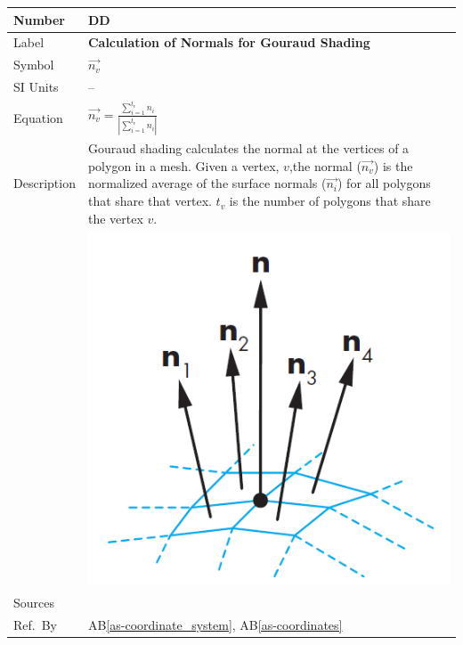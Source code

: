 \documentclass[12pt]{article}
\newcommand{\colAwidth}{0.13\textwidth}
\newcommand{\colBwidth}{0.82\textwidth}
\newcounter{defnum} %
\newcounter{datadefnum} %
\newcommand{\aBref}[1]{AB\ref{#1}}
\begin{document}
\noindent
\begin{minipage}{\textwidth}
	\renewcommand*{\arraystretch}{1.5}
	\begin{tabular}{| p{\colAwidth} | p{\colBwidth}|}
		\hline
		\rowcolor[gray]{0.9}
		Number& DD{datadefnum}\thedatadefnum 
		\label{DD_Gouraud_Shading}\\
		\hline
		Label& \bf Calculation of Normals for Gouraud Shading\\
		\hline
		Symbol &$\vec{n_{v}}$\\
		\hline
		SI Units & --\\
		\hline
		Equation&$\vec{n_{v}} = 
		\frac{\sum_{i=1}^{t_{v}}n_{i}}{|\sum_{i=1}^{t_{v}}n_{i}|}$\\
		\hline
		Description & Gouraud shading calculates the normal at the vertices of 
		a polygon in a mesh. Given a vertex, $v$,the normal ($\vec{n_{v}}$) is 
		the normalized average of the surface normals ($\vec{n_{i}}$) for all 
		polygons that share that vertex. $t_{v}$ is the number of polygons that 
		share the vertex $v$.\\
		& \includegraphics[]{./images/gouraud-shading-interpolation}\\
		\hline
		Sources& \cite{shreiner2012}\\
		\hline
		Ref.\ By & \aBref{as-coordinate_system}, \aBref{as-coordinates}\\
		\hline
	\end{tabular}
\end{minipage}\\
\end{document}
